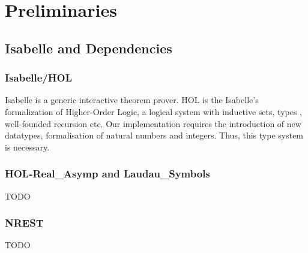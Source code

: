 \newcommand{\red}{\leq_p}
\newcommand{\problem}[3]{
\begin{definition}
    {#1} \\
    \textbf{Input}: {#2}\\
    \textbf{Output}: {#3}
\end{definition}
}
\newcommand{\bigO}[1]{$\mathcal{O}({#1})$}

\chapter{Preliminaries}\label{chapter:preliminaries}
\section{Isabelle and Dependencies}
\subsection*{Isabelle/HOL}
Isabelle is a generic interactive theorem prover. HOL is the Isabelle's formalization of Higher-Order Logic, a logical system with inductive sets, types , well-founded recursion etc. Our implementation requires the introduction of new datatypes, formalisation of natural numbers and integers. Thus, this type system is necessary.


\subsection*{HOL-Real\_Asymp and Laudau\_Symbols}
TODO

\subsection*{NREST}
TODO

